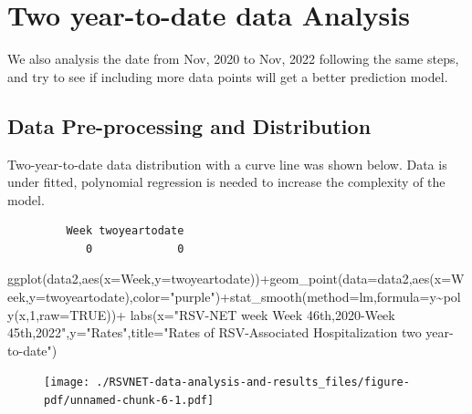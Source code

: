 \documentclass[
  letterpaper,
  DIV=11,
  numbers=noendperiod]{scrreport}
\newenvironment{Shaded}{\begin{snugshade}}{\end{snugshade}}
\newcommand{\AttributeTok}[1]{\textcolor[rgb]{0.40,0.45,0.13}{#1}}
\newcommand{\ConstantTok}[1]{\textcolor[rgb]{0.56,0.35,0.01}{#1}}
\newcommand{\DecValTok}[1]{\textcolor[rgb]{0.68,0.00,0.00}{#1}}
\newcommand{\FunctionTok}[1]{\textcolor[rgb]{0.28,0.35,0.67}{#1}}
\newcommand{\NormalTok}[1]{\textcolor[rgb]{0.00,0.23,0.31}{#1}}
\newcommand{\SpecialCharTok}[1]{\textcolor[rgb]{0.37,0.37,0.37}{#1}}
\newcommand{\StringTok}[1]{\textcolor[rgb]{0.13,0.47,0.30}{#1}}
\begin{document}
\hypertarget{two-year-to-date-data-analysis}{%
\section{Two year-to-date data
Analysis}\label{two-year-to-date-data-analysis}}

We also analysis the date from Nov, 2020 to Nov, 2022 following the same
steps, and try to see if including more data points will get a better
prediction model.

\hypertarget{data-pre-processing-and-distribution-1}{%
\subsection{Data Pre-processing and
Distribution}\label{data-pre-processing-and-distribution-1}}

Two-year-to-date data distribution with a curve line was shown below.
Data is under fitted, polynomial regression is needed to increase the
complexity of the model.

\begin{verbatim}
         Week twoyeartodate 
            0             0 
\end{verbatim}

\begin{Shaded}
\begin{Highlighting}[]
\FunctionTok{ggplot}\NormalTok{(data2,}\FunctionTok{aes}\NormalTok{(}\AttributeTok{x=}\NormalTok{Week,}\AttributeTok{y=}\NormalTok{twoyeartodate))}\SpecialCharTok{+}\FunctionTok{geom\_point}\NormalTok{(}\AttributeTok{data=}\NormalTok{data2,}\FunctionTok{aes}\NormalTok{(}\AttributeTok{x=}\NormalTok{Week,}\AttributeTok{y=}\NormalTok{twoyeartodate),}\AttributeTok{color=}\StringTok{"purple"}\NormalTok{)}\SpecialCharTok{+}\FunctionTok{stat\_smooth}\NormalTok{(}\AttributeTok{method=}\NormalTok{lm,}\AttributeTok{formula=}\NormalTok{y}\SpecialCharTok{\textasciitilde{}}\FunctionTok{poly}\NormalTok{(x,}\DecValTok{1}\NormalTok{,}\AttributeTok{raw=}\ConstantTok{TRUE}\NormalTok{))}\SpecialCharTok{+}
  \FunctionTok{labs}\NormalTok{(}\AttributeTok{x=}\StringTok{"RSV{-}NET week Week 46th,2020{-}Week 45th,2022"}\NormalTok{,}\AttributeTok{y=}\StringTok{"Rates"}\NormalTok{,}\AttributeTok{title=}\StringTok{"Rates of RSV{-}Associated Hospitalization two year{-}to{-}date"}\NormalTok{)}
\end{Highlighting}
\end{Shaded}

\begin{figure}[H]

{\centering \texttt{[image: ./RSVNET-data-analysis-and-results\_files/figure-pdf/unnamed-chunk-6-1.pdf]}

}

\end{figure}
\end{document}
